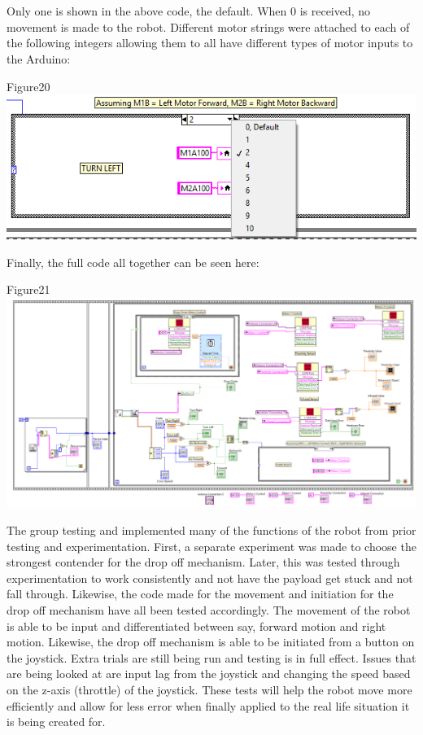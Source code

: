 \documentclass{article}
\begin{document}
\\\\Only one is shown in the above code, the default. When 0 is received, no movement is made to the robot. Different motor strings were attached to each of the following integers allowing them to all have different types of motor inputs to the Arduino: 
\begin{center}{Figure20 \includegraphics[width=\textwidth]{CaseState.png}}\end{center}


Finally, the full code all together can be seen here:
\begin{center}{Figure21 \includegraphics[width=\textwidth]{FullCode.png}}\end{center}


The group testing and implemented many of the functions of the robot from prior testing and experimentation. First, a separate experiment was made to choose the strongest contender for the drop off mechanism. Later, this was tested through experimentation to work consistently and not have the payload get stuck and not fall through. 
Likewise, the code made for the movement and initiation for the drop off mechanism have all been tested accordingly. The movement of the robot is able to be input and differentiated between say, forward motion and right motion. Likewise, the drop off mechanism is able to be initiated from a button on the joystick. Extra trials are still being run and testing is in full effect. Issues that are being looked at are input lag from the joystick and changing the speed based on the z-axis (throttle) of the joystick. These tests will help the robot move more efficiently and allow for less error when finally applied to the real life situation it is being created for.
\end{document}
